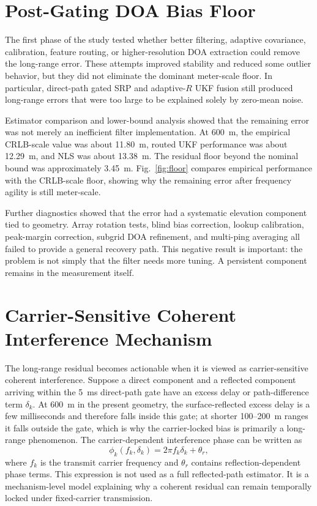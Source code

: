 \documentclass[journal]{IEEEtran}
\begin{document}
\section{Post-Gating DOA Bias Floor}
The first phase of the study tested whether better filtering, adaptive covariance, calibration,
feature routing, or higher-resolution DOA extraction could remove the long-range error. These
attempts improved stability and reduced some outlier behavior, but they did not eliminate the
dominant meter-scale floor. In particular, direct-path gated SRP and adaptive-$R$ UKF fusion still
produced long-range errors that were too large to be explained solely by zero-mean noise.

Estimator comparison and lower-bound analysis showed that the remaining error was not merely an
inefficient filter implementation. At 600~m, the empirical CRLB-scale value was about 11.80~m,
routed UKF performance was about 12.29~m, and NLS was about 13.38~m. The residual floor beyond the
nominal bound was approximately 3.45~m. Fig.~\ref{fig:floor} compares empirical performance with
the CRLB-scale floor, showing why the remaining error after frequency agility is still
meter-scale.

Further diagnostics showed that the error had a systematic elevation component tied to geometry.
Array rotation tests, blind bias correction, lookup calibration, peak-margin correction, subgrid
DOA refinement, and multi-ping averaging all failed to provide a general recovery path. This
negative result is important: the problem is not simply that the filter needs more tuning. A
persistent component remains in the measurement itself.

\section{Carrier-Sensitive Coherent Interference Mechanism}
The long-range residual becomes actionable when it is viewed as carrier-sensitive coherent
interference. Suppose a direct component and a reflected component arriving within the 5~ms
direct-path gate have an excess delay or path-difference term $\delta_k$. At 600~m in the present
geometry, the surface-reflected excess delay is a few milliseconds and therefore falls inside this
gate; at shorter 100--200~m ranges it falls outside the gate, which is why the carrier-locked bias
is primarily a long-range phenomenon. The carrier-dependent interference phase can be written as
\begin{equation}
\phi_k(f_k,\delta_k)=2\pi f_k\delta_k+\theta_r,
\end{equation}
where $f_k$ is the transmit carrier frequency and $\theta_r$ contains reflection-dependent phase
terms. This expression is not used as a full reflected-path estimator. It is a mechanism-level
model explaining why a coherent residual can remain temporally locked under fixed-carrier
transmission.
\end{document}
